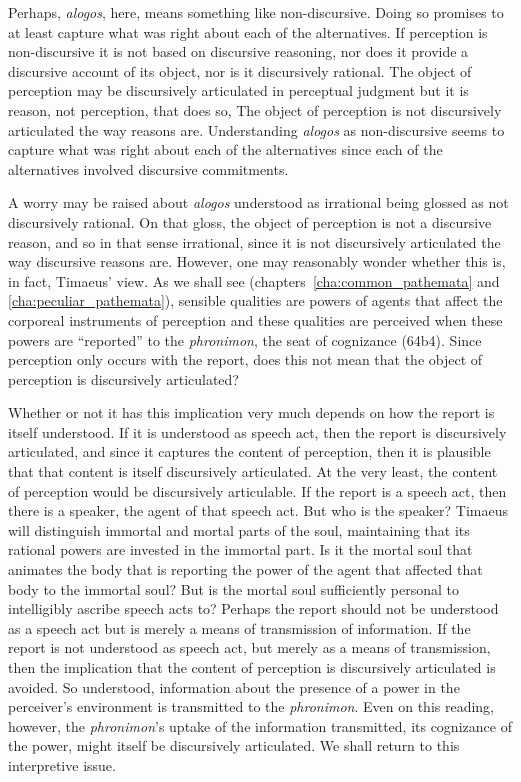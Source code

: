 Perhaps, \emph{alogos}, here, means something like non-discursive. Doing so pro\-mises to at least capture what was right about each of the alternatives. If perception is non-discursive it is not based on discursive reasoning, nor does it provide a discursive account of its object, nor is it discursively rational. The object of perception may be discursively articulated in perceptual judgment but it is reason, not perception, that does so, The object of perception is not discursively articulated the way reasons are. Understanding \emph{alogos} as non-discursive seems to capture what was right about each of the alternatives since each of the alternatives involved discursive commitments.

A worry may be raised about \emph{alogos} understood as irrational being glossed as not discursively rational. On that gloss, the object of perception is not a discursive reason, and so in that sense irrational, since it is not discursively articulated the way discursive reasons are. However, one may reasonably wonder whether this is, in fact, Timaeus' view. As we shall see (chapters~\ref{cha:common_pathemata} and \ref{cha:peculiar_pathemata}), sensible qualities are powers of agents that affect the corporeal instruments of perception and these qualities are perceived when these powers are ``reported'' to the \emph{phronimon}, the seat of cognizance (64b4). Since perception only occurs with the report, does this not mean that the object of perception is discursively articulated?

Whether or not it has this implication very much depends on how the report is itself understood. If it is understood as speech act, then the report is discursively articulated, and since it captures the content of perception, then it is plausible that that content is itself discursively articulated. At the very least, the content of perception would be discursively articulable. If the report is a speech act, then there is a speaker, the agent of that speech act. But who is the speaker? Timaeus will distinguish immortal and mortal parts of the soul, maintaining that its rational powers are invested in the immortal part. Is it the mortal soul that animates the body that is reporting the power of the agent that affected that body to the immortal soul? But is the mortal soul sufficiently personal to intelligibly ascribe speech acts to? Perhaps the report should not be understood as a speech act but is merely a means of transmission of information. If the report is not understood as speech act, but merely as a means of transmission, then the implication that the content of perception is discursively articulated is avoided. So understood, information about the presence of a power in the perceiver's environment is transmitted to the \emph{phronimon}. Even on this reading, however, the \emph{phronimon}'s uptake of the information transmitted, its cognizance of the power, might itself be discursively articulated. We shall return to this interpretive issue.

